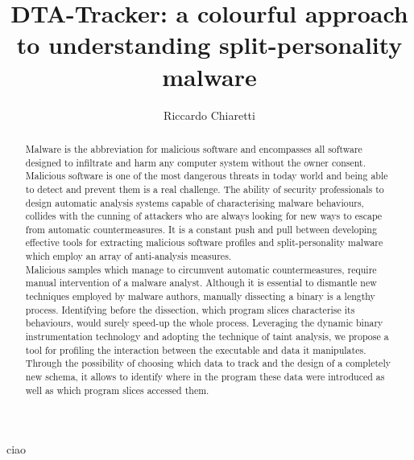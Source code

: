 \documentclass[LaM,binding=0.6cm]{sapthesis}
\title{DTA-Tracker: a colourful approach to understanding split-personality malware}
\author{Riccardo Chiaretti}
\begin{document}
\frontmatter
\maketitle

\dedication{Dedicated to\\ Donald Knuth}

\begin{abstract}
Malware is the abbreviation for malicious software and encompasses all software designed to infiltrate and harm any computer system without the owner consent. Malicious software is one of the most dangerous threats in today world and being able to detect and prevent them is a real challenge. The ability of security professionals to design automatic analysis systems capable of characterising malware behaviours, collides with the cunning of attackers who are always looking for new ways to escape from automatic countermeasures. It is a constant push and pull between developing effective tools for extracting malicious software profiles and split-personality malware which employ an array of anti-analysis measures.\\
Malicious samples which manage to circumvent automatic countermeasures, require manual intervention of a malware analyst. Although it is essential to dismantle new techniques employed by malware authors, manually dissecting a binary is a lengthy process. Identifying before the dissection, which program slices characterise its behaviours, would surely speed-up the whole process. Leveraging the dynamic binary instrumentation technology and adopting the technique of taint analysis, we propose a tool for profiling the interaction between the executable and data it manipulates. Through the possibility of choosing which data to track and the design of a completely new schema, it allows to identify where in the program these data were introduced as well as which program slices accessed them. 
\end{abstract}

\begin{acknowledgments}
ciao
\end{acknowledgments}

\tableofcontents

\mainmatter
\end{document}
